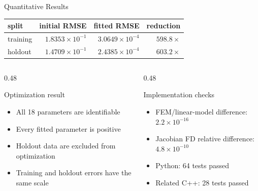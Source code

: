 \documentclass[aspectratio=169,10pt]{beamer}
\begin{document}
\begin{frame}{Quantitative Results}
  \small
  \begin{table}
    \centering
    \begin{tabular}{lrrr}
      \toprule
      split & initial RMSE & fitted RMSE & reduction \\
      \midrule
      training & $1.8353\times10^{-1}$ & $3.0649\times10^{-4}$ & $598.8\times$ \\
      holdout & $1.4709\times10^{-1}$ & $2.4385\times10^{-4}$ & $603.2\times$ \\
      \bottomrule
    \end{tabular}
  \end{table}

  \vspace{0.7em}
  \begin{columns}[T]
    \begin{column}{0.48\linewidth}
      \begin{block}{Optimization result}
        \begin{itemize}
          \item All 18 parameters are identifiable
          \item Every fitted parameter is positive
          \item Holdout data are excluded from optimization
          \item Training and holdout errors have the same scale
        \end{itemize}
      \end{block}
    \end{column}
    \begin{column}{0.48\linewidth}
      \begin{block}{Implementation checks}
        \begin{itemize}
          \item FEM/linear-model difference: $2.2\times10^{-16}$
          \item Jacobian FD relative difference: $4.8\times10^{-10}$
          \item Python: 64 tests passed
          \item Related C++: 28 tests passed
        \end{itemize}
      \end{block}
    \end{column}
  \end{columns}
\end{frame}
\end{document}
